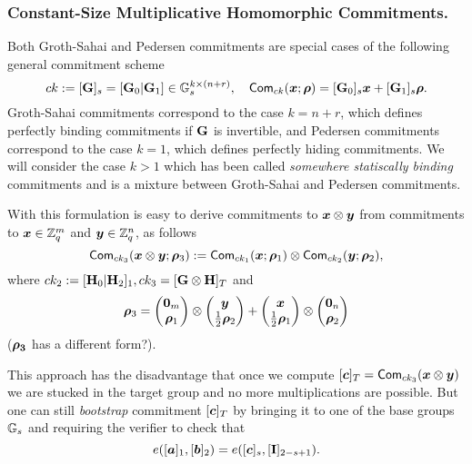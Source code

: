 \subsubsection{Constant-Size  Multiplicative Homomorphic Commitments.}
Both Groth-Sahai and Pedersen commitments are special cases of the following general commitment scheme
$$
ck:=[\mathbf{{G}}]_s=[\mathbf{{G}}_0|\mathbf{{G}}_1]\in\mathbb{G}_s^{k\times (n+r)}, \quad \mathsf{Com}_{ck}({\boldsymbol{x}};{\boldsymbol{\rho}})=[\mathbf{{G}}_0]_s{\boldsymbol{x}}+[\mathbf{{G}}_1]_s{\boldsymbol{\rho}}.
$$
Groth-Sahai commitments correspond to the case $k=n+r$, which defines perfectly binding commitments if $\mathbf{{G}}$ is invertible, and Pedersen commitments correspond to the case $k=1$, which defines perfectly hiding commitments. We will consider the case $k>1$ which has been called \emph{somewhere statiscally binding} commitments and is a mixture between Groth-Sahai and Pedersen commitments.

With this formulation is easy to derive commitments to ${\boldsymbol{x}}\otimes{\boldsymbol{y}}$ from commitments to ${\boldsymbol{x}}\in\mathbb{Z}_q^m$ and ${\boldsymbol{y}}\in\mathbb{Z}_q^n$, as follows
$$
\mathsf{Com}_{ck_3}({\boldsymbol{{\boldsymbol{x}}}}\otimes{\boldsymbol{y}};{\boldsymbol{\rho}}_3):=\mathsf{Com}_{ck_1}({\boldsymbol{x}};{\boldsymbol{\rho}}_1)\otimes\mathsf{Com}_{ck_2}({\boldsymbol{y}};{\boldsymbol{\rho}}_2),
$$
where $ck_2:=[\mathbf{{H}}_0|\mathbf{{H}}_2]_1,ck_3=[\mathbf{{G}}\otimes\mathbf{{H}}]_T$ and
$${\boldsymbol{\rho}}_3=\left(\begin{matrix}{\boldsymbol{0}}_m\\{\boldsymbol{\rho}}_1\end{matrix}\right)\otimes\left(\begin{matrix}{\boldsymbol{y}}\\\frac{1}{2}{\boldsymbol{\rho}}_2\end{matrix}\right)+\left(\begin{matrix}{\boldsymbol{x}}\\\frac{1}{2}{\boldsymbol{\rho}}_1\end{matrix}\right)\otimes\left(\begin{matrix}{\boldsymbol{0}}_n\\{\boldsymbol{\rho}}_2\end{matrix}\right)$$ (${\boldsymbol{\rho_3}}$ has a different form?).

This approach has the disadvantage that once we compute $[{\boldsymbol{c}}]_T=\mathsf{Com}_{ck_3}({\boldsymbol{x}}\otimes{\boldsymbol{y}})$ we are stucked in the target group and no more multiplications are possible. But one can still \emph{bootstrap} commitment $[{\boldsymbol{c}}]_T$  by bringing it to one of the base groups $\mathbb{G}_s$ and requiring the verifier to check that
$$
e([{\boldsymbol{a}}]_1,[{\boldsymbol{b}}]_2)=e([{\boldsymbol{c}}]_s,[\mathbf{{I}}]_{2-s+1}).
$$
%
%

